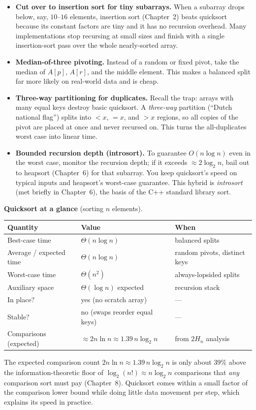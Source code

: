 \begin{itemize}
\item \textbf{Cut over to insertion sort for tiny subarrays.} When a subarray
drops below, say, $10$--$16$ elements, insertion sort (Chapter~2) beats
quicksort because its constant factors are tiny and it has no recursion
overhead. Many implementations stop recursing at small sizes and finish with a
single insertion-sort pass over the whole nearly-sorted array.
\item \textbf{Median-of-three pivoting.} Instead of a random or fixed pivot,
take the median of $A[p]$, $A[r]$, and the middle element. This makes a balanced
split far more likely on real-world data and is cheap.
\item \textbf{Three-way partitioning for duplicates.} Recall the trap: arrays
with many equal keys destroy basic quicksort. A \emph{three-way} partition
(``Dutch national flag'') splits into $< x$, $= x$, and $> x$ regions, so all
copies of the pivot are placed at once and never recursed on. This turns the
all-duplicates worst case into linear time.
\item \textbf{Bounded recursion depth (introsort).} To guarantee
$O(n \log n)$ even in the worst case, monitor the recursion depth; if it exceeds
$\approx 2\log_2 n$, bail out to heapsort (Chapter~6) for that subarray. You keep
quicksort's speed on typical inputs and heapsort's worst-case guarantee. This
hybrid is \emph{introsort} (met briefly in Chapter~6), the basis of the C++ standard library sort.
\end{itemize}

\begin{complexitybox}
\textbf{Quicksort at a glance} (sorting $n$ elements).
\begin{center}
\begin{tabular}{lll}
\toprule
Quantity & Value & When \\
\midrule
Best-case time            & $\Theta(n \log n)$ & balanced splits \\
Average / expected time   & $\Theta(n \log n)$ & random pivots, distinct keys \\
Worst-case time           & $\Theta(n^2)$      & always-lopsided splits \\
Auxiliary space           & $\Theta(\log n)$ expected & recursion stack \\
In place?                 & yes (no scratch array) & --- \\
Stable?                   & no (swaps reorder equal keys) & --- \\
Comparisons (expected)    & $\approx 2 n \ln n \approx 1.39\, n \log_2 n$ & from $2 H_n$ analysis \\
\bottomrule
\end{tabular}
\end{center}
The expected comparison count $2 n \ln n \approx 1.39\, n \log_2 n$ is only about
$39\%$ above the information-theoretic floor of $\log_2(n!) \approx n \log_2 n$
comparisons that \emph{any} comparison sort must pay (Chapter~8). Quicksort comes
within a small factor of the comparison lower bound while doing little data
movement per step, which explains its speed in practice.
\end{complexitybox}

